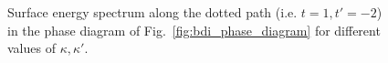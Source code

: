 \documentclass[twocolumn,amsmath,longbibliography,amssymb,superscriptaddress]{revtex4-1}
\begin{document}
\begin{figure}[h!]
\centering

\hspace{0mm}

\caption{Surface energy spectrum along the dotted path (i.e. $t=1,t'=-2$) in the phase diagram of Fig.~\ref{fig:bdi_phase_diagram} for different values of $\kappa,\kappa'$.}
\label{fig:zero_E_modes}
\end{figure}

\end{document}
